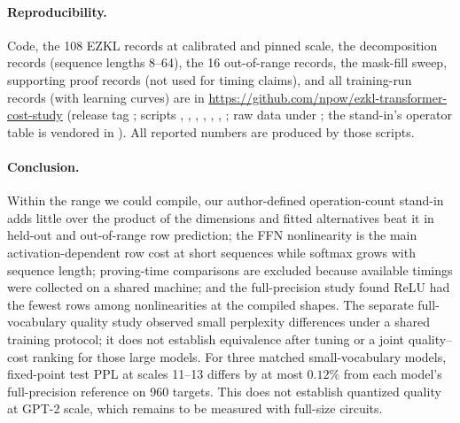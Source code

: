\documentclass[10pt]{article}
\begin{document}
\paragraph{Reproducibility.}
\begingroup\sloppy
Code, the 108 EZKL records at calibrated and pinned scale, the decomposition
records (sequence lengths 8--64), the 16 out-of-range records, the mask-fill
sweep, supporting proof records (not used for timing claims), and
all training-run records (with learning curves) are in
\url{https://github.com/npow/ezkl-transformer-cost-study} (release tag
; scripts ,
, ,
, ,
,
; raw data under ; the stand-in's
operator table is vendored in ). All reported numbers are
produced by those scripts.
\endgroup

\paragraph{Conclusion.}
Within the range we could compile, our author-defined operation-count stand-in adds
little over the product of the dimensions and fitted alternatives beat it in
held-out and out-of-range row prediction; the FFN nonlinearity is the main
activation-dependent row cost at short sequences while softmax grows with
sequence length; proving-time comparisons are excluded because available timings
were collected on a shared machine; and the full-precision study found ReLU had
the fewest rows among nonlinearities at the compiled shapes. The separate
full-vocabulary quality study observed small perplexity differences under a
shared training protocol; it does not establish equivalence after tuning or a
joint quality--cost ranking for those large models. For three matched small-vocabulary models, fixed-point test PPL
at scales 11--13 differs by at most $0.12\%$ from each model's full-precision
reference on 960 targets. This does not establish quantized quality at GPT-2
scale, which remains to be measured with full-size circuits.


\end{document}
